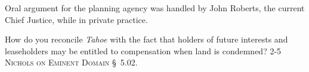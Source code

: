 
\item Oral argument for the planning agency was handled by John Roberts, the
current Chief Justice, while in private practice.

\item How do you reconcile \textit{Tahoe} with the fact that holders of future
interests and leaseholders may be entitled to compensation when land is
condemned? 2-5 \textsc{Nichols on Eminent Domain} \S~5.02.


